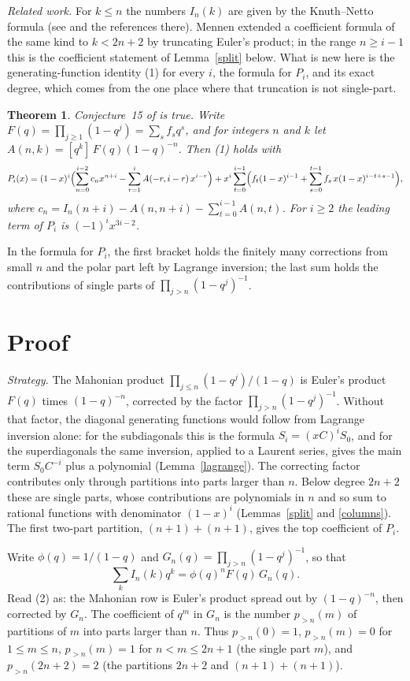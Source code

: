 \documentclass[11pt]{amsart}
\newtheorem{theorem}{Theorem}
\theoremstyle{remark}\newtheorem*{remark}{Remark}
\begin{document}


\emph{Related work.} For $k\le n$ the numbers $I_n(k)$ are given by the Knuth--Netto formula (see \cite[Sec.~1]{CFS}
and the references there). Mennen \cite{M} extended a coefficient formula of the same kind to $k<2n+2$ by truncating
Euler's product; in the range $n\ge i-1$ this is the coefficient statement of Lemma~\ref{split} below. What is new
here is the generating-function identity (1) for every $i$, the formula for $P_i$, and its exact degree, which comes
from the one place where that truncation is not single-part.

\begin{theorem}\label{thm}
Conjecture~15 of \cite{CFS} is true. Write $F(q)=\prod_{j\ge1}(1-q^j)=\sum_s f_sq^s$, and for integers $n$ and $k$ let
$A(n,k)=[q^k]\,F(q)(1-q)^{-n}$. Then \textup{(1)} holds with
\[
P_i(x)=(1-x)^i\Bigl(\sum_{n=0}^{i-2}c_n x^{n+i}-\sum_{r=1}^{i}A(-r,i-r)\,x^{i-r}\Bigr)
+x^i\sum_{t=0}^{i-1}\Bigl(f_t(1-x)^{i-1}+\sum_{s=0}^{t-1}f_s\,x(1-x)^{i-t+s-1}\Bigr),
\]
where $c_n=I_n(n+i)-A(n,n+i)-\sum_{t=0}^{i-1}A(n,t)$. For $i\ge2$ the leading term of $P_i$ is $(-1)^ix^{3i-2}$.
\end{theorem}
In the formula for $P_i$, the first bracket holds the finitely many corrections from small $n$ and the polar part left
by Lagrange inversion; the last sum holds the contributions of single parts of $\prod_{j>n}(1-q^j)^{-1}$.

\section{Proof}
\emph{Strategy.} The Mahonian product $\prod_{j\le n}(1-q^j)/(1-q)$ is Euler's product $F(q)$ times $(1-q)^{-n}$,
corrected by the factor $\prod_{j>n}(1-q^j)^{-1}$. Without that factor, the diagonal generating functions would follow
from Lagrange inversion alone: for the subdiagonals this is the formula $S_i=(xC)^iS_0$, and for the superdiagonals
the same inversion, applied to a Laurent series, gives the main term $S_0C^{-i}$ plus a polynomial (Lemma~\ref{lagrange}).
The correcting factor contributes only through partitions into parts larger than $n$. Below degree $2n+2$ these are
single parts, whose contributions are polynomials in $n$ and so sum to rational functions with denominator
$(1-x)^{i}$ (Lemmas~\ref{split} and \ref{columns}). The first two-part partition, $(n+1)+(n+1)$, gives the top
coefficient of $P_i$.

Write $\phi(q)=1/(1-q)$ and $G_n(q)=\prod_{j>n}(1-q^j)^{-1}$, so that
\[
\sum_k I_n(k)q^k=\phi(q)^n F(q)\,G_n(q). \tag{2}
\]
Read (2) as: the Mahonian row is Euler's product spread out by $(1-q)^{-n}$, then corrected by $G_n$.
The coefficient of $q^m$ in $G_n$ is the number $p_{>n}(m)$ of partitions of $m$ into parts larger than $n$. Thus
$p_{>n}(0)=1$, $p_{>n}(m)=0$ for $1\le m\le n$, $p_{>n}(m)=1$ for $n<m\le 2n+1$ (the single part $m$), and
$p_{>n}(2n+2)=2$ (the partitions $2n+2$ and $(n+1)+(n+1)$).
\end{document}
